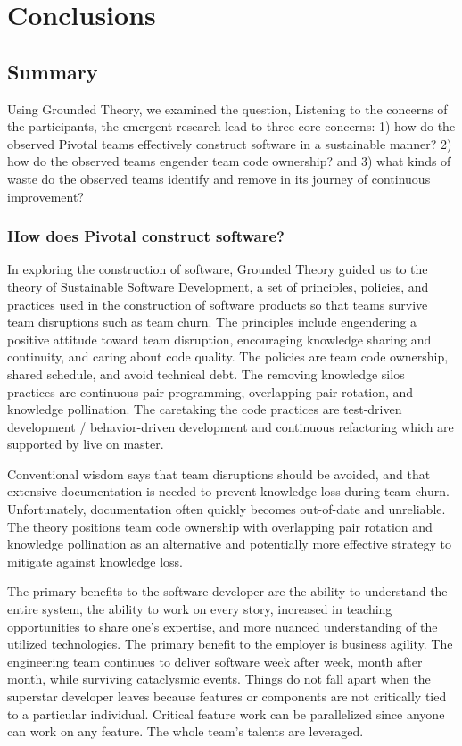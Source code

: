 
\chapter{Conclusions}
\label{ConclusionChapter}
\section{Summary}
Using Grounded Theory, we examined the question,  Listening to the concerns of the participants, the emergent research lead to three core concerns: 1) how do the observed Pivotal teams effectively construct software in a sustainable manner? 2) how do the observed teams engender team code ownership? and 3) what kinds of waste do the observed teams identify and remove in its journey of continuous improvement? 

\subsection{How does Pivotal construct software?}
In exploring the construction of software, Grounded Theory guided us to the theory of Sustainable Software Development, a set of principles, policies, and practices used in the construction of software products so that teams survive team disruptions such as team churn. The principles include engendering a positive attitude toward team disruption, encouraging knowledge sharing and continuity, and caring about code quality. The policies are team code ownership, shared schedule, and avoid technical debt. The removing knowledge silos practices are continuous pair programming, overlapping pair rotation, and knowledge pollination. The caretaking the code practices are test-driven development / behavior-driven development and continuous refactoring which are supported by live on master.

Conventional wisdom says that team disruptions should be avoided, and that extensive documentation is needed to prevent knowledge loss during team churn. Unfortunately, documentation often quickly becomes out-of-date and unreliable. The theory positions team code ownership with overlapping pair rotation and knowledge pollination as an alternative and potentially more effective strategy to mitigate against knowledge loss.

The primary benefits to the software developer are the ability to understand the entire system, the ability to work on every story, increased in teaching opportunities to share one's expertise, and more nuanced understanding of the utilized technologies.
The primary benefit to the employer is business agility. The engineering team continues to deliver software week after week, month after month, while surviving cataclysmic events. Things do not fall apart when the superstar developer leaves because features or components are not critically tied to a particular individual. Critical feature work can be parallelized since anyone can work on any feature. The whole team's talents are leveraged.

